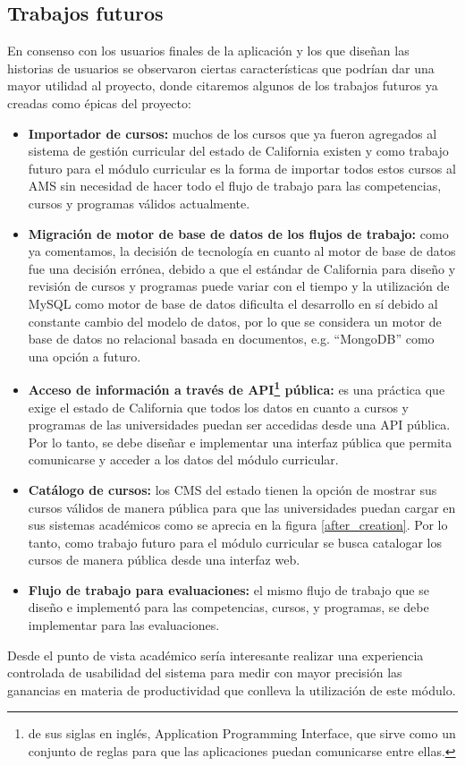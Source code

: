 \subsection{Trabajos futuros}
En consenso con los usuarios finales de la aplicación y los que diseñan las historias de usuarios se observaron ciertas características que podrían dar una mayor utilidad al proyecto, donde citaremos algunos de los trabajos futuros ya creadas como épicas del proyecto:
\begin{itemize}
	\item \textbf{Importador de cursos:} muchos de los cursos que ya fueron agregados al sistema de gestión curricular del estado de California existen y como trabajo futuro para el módulo curricular es la forma de importar todos estos cursos al AMS sin necesidad de hacer todo el flujo de trabajo para las competencias, cursos y programas válidos actualmente.
	\item \textbf{Migración de motor de base de datos de los flujos de trabajo:} como ya comentamos, la decisión de tecnología en cuanto al motor de base de datos fue una decisión errónea, debido a que el estándar de California para diseño y revisión de cursos y programas puede variar con el tiempo y la utilización de MySQL como motor de base de datos dificulta el desarrollo en sí debido al constante cambio del modelo de datos, por lo que se considera un motor de base de datos no relacional basada en documentos, e.g. \enquote{MongoDB} como una opción a futuro.
	\item \textbf{Acceso de información a través de API\footnote{de sus siglas en inglés, Application Programming Interface, que sirve como un conjunto de reglas para que las aplicaciones puedan comunicarse entre ellas.} pública:} es una práctica que exige el estado de California que todos los datos en cuanto a cursos y programas de las universidades puedan ser accedidas desde una API pública. Por lo tanto, se debe diseñar e implementar una interfaz pública que permita comunicarse y acceder a los datos del módulo curricular.
	\item \textbf{Catálogo de cursos:} los CMS del estado tienen la opción de mostrar sus cursos válidos de manera pública para que las universidades puedan cargar en sus sistemas académicos como se aprecia en la figura \ref{after_creation}. Por lo tanto, como trabajo futuro para el módulo curricular se busca catalogar los cursos de manera pública desde una interfaz web.
	\item \textbf{Flujo de trabajo para evaluaciones:} el mismo flujo de trabajo que se diseño e implementó para las competencias, cursos, y programas, se debe implementar para las evaluaciones.
\end{itemize}
Desde el punto de vista académico sería interesante realizar una experiencia controlada de usabilidad del sistema para medir con mayor precisión las ganancias en materia de productividad que conlleva la utilización de este módulo.